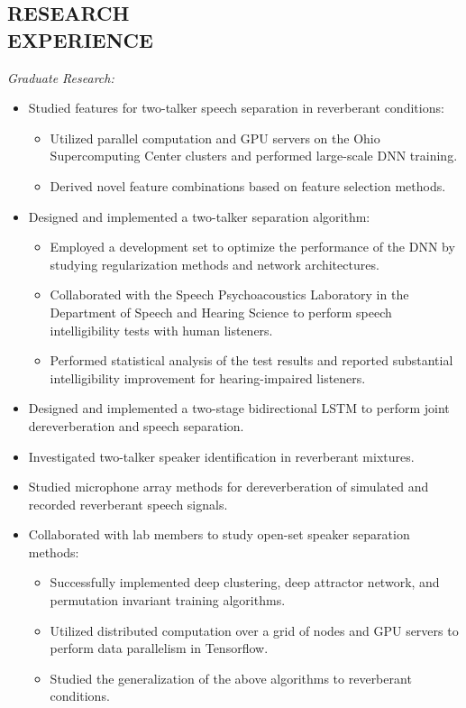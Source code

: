 \documentclass[margin, 10pt]{res}
\begin{document}
\begin{resume}
\section{RESEARCH \\ EXPERIENCE}
\textit{Graduate Research:}
\begin{itemize}
\item Studied features for two-talker speech separation in reverberant conditions:
	\begin{itemize}
	\item Utilized parallel computation and GPU servers on the Ohio Supercomputing Center clusters and performed large-scale DNN training.
	\item Derived novel feature combinations based on feature selection methods.
	\end{itemize}
\item Designed and implemented a two-talker separation algorithm:
	\begin{itemize}
	\item Employed a development set to optimize the performance of the DNN by studying regularization methods and network architectures.
	\item Collaborated with the Speech Psychoacoustics Laboratory in the Department of Speech and Hearing Science to perform speech intelligibility tests with human listeners.
	\item Performed statistical analysis of the test results and reported substantial intelligibility improvement for hearing-impaired listeners.
	\end{itemize}
\item Designed and implemented a two-stage bidirectional LSTM to perform joint dereverberation and speech separation.
\item Investigated two-talker speaker identification in reverberant mixtures.
\item Studied microphone array methods for dereverberation of simulated and recorded reverberant speech signals.
\item Collaborated with lab members to study open-set speaker separation methods:
	\begin{itemize}
	\item Successfully implemented deep clustering, deep attractor network, and permutation invariant training algorithms.
	\item Utilized distributed computation over a grid of nodes and GPU servers to perform data parallelism in Tensorflow.
	\item Studied the generalization of the above algorithms to reverberant conditions.

\end{itemize}
\end{itemize}
\end{resume}
\end{document}
